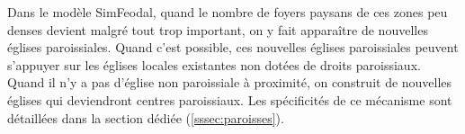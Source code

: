 \begin{itemize}
	\begin{tcolorbox}[breakable,left=0pt,right=0pt,top=0pt,bottom=0pt,
		colback=gray!15,colframe=gray!15,width=\dimexpr0.94\textwidth\relax, 
		enlarge left by=0mm, boxsep=5pt,arc=0pt,outer arc=0pt]
	Dans le modèle SimFeodal, quand le nombre de foyers paysans de ces zones peu denses devient malgré tout trop important, on y fait apparaître de nouvelles églises paroissiales.
	Quand c'est possible, ces nouvelles églises paroissiales peuvent s'appuyer sur les églises locales existantes non dotées de droits paroissiaux.
	Quand il n'y a pas d'église non paroissiale à proximité, on construit de nouvelles églises qui deviendront centres paroissiaux.
	Les spécificités de ce mécanisme sont détaillées dans la section dédiée (\cref{sssec:paroisses}).
\end{tcolorbox}
\end{itemize}



%

